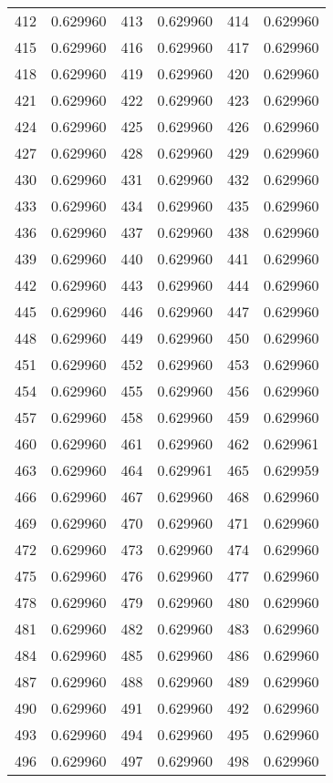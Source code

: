 \documentclass[12pt]{article}
\begin{document}
\begin{longtable}{@{}cc|cc|cc@{}}
412 & 0.629960 & 413 & 0.629960 & 414 & 0.629960 \\
415 & 0.629960 & 416 & 0.629960 & 417 & 0.629960 \\
418 & 0.629960 & 419 & 0.629960 & 420 & 0.629960 \\
421 & 0.629960 & 422 & 0.629960 & 423 & 0.629960 \\
424 & 0.629960 & 425 & 0.629960 & 426 & 0.629960 \\
427 & 0.629960 & 428 & 0.629960 & 429 & 0.629960 \\
430 & 0.629960 & 431 & 0.629960 & 432 & 0.629960 \\
433 & 0.629960 & 434 & 0.629960 & 435 & 0.629960 \\
436 & 0.629960 & 437 & 0.629960 & 438 & 0.629960 \\
439 & 0.629960 & 440 & 0.629960 & 441 & 0.629960 \\
442 & 0.629960 & 443 & 0.629960 & 444 & 0.629960 \\
445 & 0.629960 & 446 & 0.629960 & 447 & 0.629960 \\
448 & 0.629960 & 449 & 0.629960 & 450 & 0.629960 \\
451 & 0.629960 & 452 & 0.629960 & 453 & 0.629960 \\
454 & 0.629960 & 455 & 0.629960 & 456 & 0.629960 \\
457 & 0.629960 & 458 & 0.629960 & 459 & 0.629960 \\
460 & 0.629960 & 461 & 0.629960 & 462 & 0.629961 \\
463 & 0.629960 & 464 & 0.629961 & 465 & 0.629959 \\
466 & 0.629960 & 467 & 0.629960 & 468 & 0.629960 \\
469 & 0.629960 & 470 & 0.629960 & 471 & 0.629960 \\
472 & 0.629960 & 473 & 0.629960 & 474 & 0.629960 \\
475 & 0.629960 & 476 & 0.629960 & 477 & 0.629960 \\
478 & 0.629960 & 479 & 0.629960 & 480 & 0.629960 \\
481 & 0.629960 & 482 & 0.629960 & 483 & 0.629960 \\
484 & 0.629960 & 485 & 0.629960 & 486 & 0.629960 \\
487 & 0.629960 & 488 & 0.629960 & 489 & 0.629960 \\
490 & 0.629960 & 491 & 0.629960 & 492 & 0.629960 \\
493 & 0.629960 & 494 & 0.629960 & 495 & 0.629960 \\
496 & 0.629960 & 497 & 0.629960 & 498 & 0.629960 \\

\end{longtable}
\end{document}
